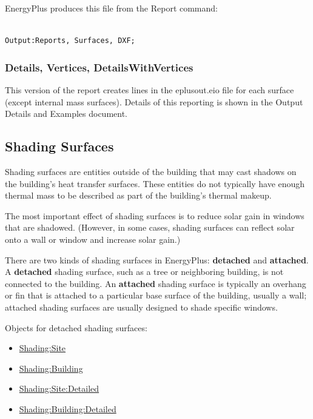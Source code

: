 EnergyPlus produces this file from the Report command:

\begin{lstlisting}

Output:Reports, Surfaces, DXF;
\end{lstlisting}

\subsubsection{Details, Vertices, DetailsWithVertices}\label{details-vertices-detailswithvertices}

This version of the report creates lines in the eplusout.eio file for each surface (except internal mass surfaces). Details of this reporting is shown in the Output Details and Examples document.

\subsection{Shading Surfaces}\label{shading-surfaces}

Shading surfaces are entities outside of the building that may cast shadows on the building's heat transfer surfaces. These entities do not typically have enough thermal mass to be described as part of the building's thermal makeup.

The most important effect of shading surfaces is to reduce solar gain in windows that are shadowed. (However, in some cases, shading surfaces can reflect solar onto a wall or window and increase solar gain.)

There are two kinds of shading surfaces in EnergyPlus: \textbf{detached} and \textbf{attached}. A \textbf{detached} shading surface, such as a tree or neighboring building, is not connected to the building. An \textbf{attached} shading surface is typically an overhang or fin that is attached to a particular base surface of the building, usually a wall; attached shading surfaces are usually designed to shade specific windows.

Objects for detached shading surfaces:

\begin{itemize}
\item
  \hyperref[shadingsite-shadingbuilding]{Shading:Site}
\item
  \hyperref[shadingsite-shadingbuilding]{Shading:Building}
\item
  \hyperref[shadingsitedetailed-shadingbuildingdetailed]{Shading:Site:Detailed}
\item
  \hyperref[shadingsitedetailed-shadingbuildingdetailed]{Shading:Building:Detailed}
\end{itemize}


